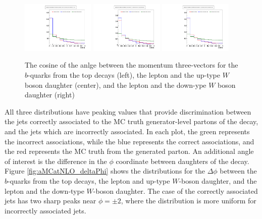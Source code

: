 \begin{figure}[hbtp] 
  {\centering
    \includegraphics[width=0.31\textwidth]{Figures/Analysis_Improvement_Diagrams/tt012jets__h_genParticle_ttbarZMFrame_topsRest_cos3dPolarAngle_lepB_hadB__vs__h_recoJets_correctAssoc_ttbarZMFrame_topsRest_cos3dPolarAngle_lepB_hadB__vs__h_recoJets_wrongAssoc_ttbarZMFrame_topsRest_cos3dPolarAngle_lepB_hadB__unitNorm.pdf}
    \includegraphics[width=0.31\textwidth]{Figures/Analysis_Improvement_Diagrams/tt012jets__h_genParticle_ttbarZMFrame_topsRest_cos3dPolarAngle_lep_hadWupQ__vs__h_recoJets_correctAssoc_ttbarZMFrame_topsRest_cos3dPolarAngle_lep_hadWupQ__vs__h_recoJets_wrongAssoc_ttbarZMFrame_topsRest_cos3dPolarAngle_lep_hadWupQ__unitNorm.pdf}
    \includegraphics[width=0.31\textwidth]{Figures/Analysis_Improvement_Diagrams/tt012jets__h_genParticle_ttbarZMFrame_topsRest_cos3dPolarAngle_lepB_hadB__vs__h_recoJets_correctAssoc_ttbarZMFrame_topsRest_cos3dPolarAngle_lepB_hadB__vs__h_recoJets_wrongAssoc_ttbarZMFrame_topsRest_cos3dPolarAngle_lepB_hadB__unitNorm.pdf}
    \caption{The cosine of the anlge between the momentum
      three-vectors for the $b$-quarks from the top decays (left), the
    lepton and the up-type $W$ boson daughter (center), and the lepton
  and the down-ype $W$ boson daughter (right)}
    \label{fig:aMCatNLO_cos3dPolar}}
\end{figure}

\noindent All three distributions have peaking values that provide
discrimination between the jets correctly associated to the MC truth
generator-level partons of the \ttbar decay, and the jets which are
incorrectly associated.  In each plot, the green represents the
incorrect associations, while the blue represents the correct
associations, and the red represents the MC truth from the generated
parton.  An additional angle of interest is the difference in the
$\phi$ coordinate between daughters of the \ttbar decay.  Figure
\ref{fig:aMCatNLO_deltaPhi} shows the distributions for the
$\Delta\phi$ between the $b$-quarks from the top decays, the lepton
and up-type $W$-boson daughter, and the lepton and the down-type
$W$-boson daughter.  The case of the correctly associated jets has two
sharp peaks near $\phi = \pm 2$, where the distribution is more
uniform for incorrectly associated jets.  

